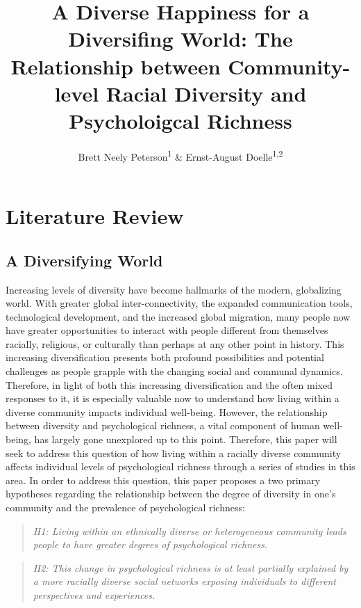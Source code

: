 \documentclass[
  man,floatsintext]{apa7}
\title{A Diverse Happiness for a Diversifing World: The Relationship between Community-level Racial Diversity and Psycholoigcal Richness}
\author{Brett Neely Peterson\textsuperscript{1} \& Ernst-August Doelle\textsuperscript{1,2}}
\date{}
\affiliation{\vspace{0.5cm}\textsuperscript{1} The University of Chicago}
\begin{document}
\maketitle

\hypertarget{literature-review}{%
\section{Literature Review}\label{literature-review}}

\hypertarget{a-diversifying-world}{%
\subsection{A Diversifying World}\label{a-diversifying-world}}

Increasing levels of diversity have become hallmarks of the modern, globalizing world. With greater global inter-connectivity, the expanded communication tools, technological development, and the increased global migration, many people now have greater opportunities to interact with people different from themselves racially, religious, or culturally than perhaps at any other point in history. This increasing diversification presents both profound possibilities and potential challenges as people grapple with the changing social and communal dynamics. Therefore, in light of both this increasing diversification and the often mixed responses to it, it is especially valuable now to understand how living within a diverse community impacts individual well-being. However, the relationship between diversity and psychological richness, a vital component of human well-being, has largely gone unexplored up to this point. Therefore, this paper will seek to address this question of how living within a racially diverse community affects individual levels of psychological richness through a series of studies in this area. In order to address this question, this paper proposes a two primary hypotheses regarding the relationship between the degree of diversity in one's community and the prevalence of psychological richness:

\begin{quote}
\emph{H1: Living within an ethnically diverse or heterogeneous community leads people to have greater degrees of psychological richness.}
\end{quote}

\begin{quote}
\emph{H2: This change in psychological richness is at least partially explained by a more racially diverse social networks exposing individuals to different perspectives and experiences.}
\end{quote}
\end{document}
